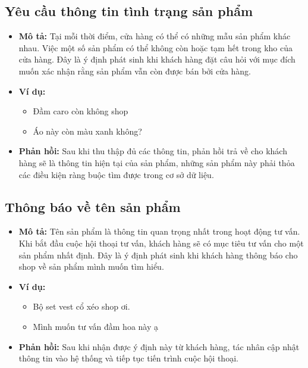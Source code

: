\subsection{Yêu cầu thông tin tình trạng sản phẩm}
\begin{itemize}
    \item \textbf{Mô tả:} Tại mỗi thời điểm, cửa hàng có thể có những mẫu sản phẩm khác nhau. Việc một số sản phẩm có thể không còn hoặc tạm hết trong kho của cửa hàng. Đây là ý định phát sinh khi khách hàng đặt câu hỏi với mục đích muốn xác nhận rằng sản phẩm vẫn còn được bán bởi cửa hàng.
    \item \textbf{Ví dụ:}
    \begin{itemize}
        \item Đầm caro còn không shop
        \item Áo này còn màu xanh không?
    \end{itemize}
    \item \textbf{Phản hồi:} Sau khi thu thập đủ các thông tin, phản hồi trả về cho khách hàng sẽ là thông tin hiện tại của sản phẩm, những sản phẩm này phải thỏa các điều kiện ràng buộc tìm được trong cơ sở dữ liệu.
\end{itemize}

\subsection{Thông báo về tên sản phẩm}
\begin{itemize}
    \item \textbf{Mô tả:} Tên sản phẩm là thông tin quan trọng nhất trong hoạt động tư vấn. Khi bắt đầu cuộc hội thoại tư vấn, khách hàng sẽ có mục tiêu tư vấn cho một sản phẩm nhất định. Đây là ý định phát sinh khi khách hàng thông báo cho shop về sản phẩm mình muốn tìm hiểu.
    \item \textbf{Ví dụ:}
    \begin{itemize}
        \item Bộ set vest cổ xéo shop ơi.
        \item Mình muốn tư vấn đầm hoa này ạ
    \end{itemize}
    \item \textbf{Phản hồi:} Sau khi nhận được ý định này từ khách hàng, tác nhân cập nhật thông tin vào hệ thống và tiếp tục tiến trình cuộc hội thoại.
\end{itemize}

